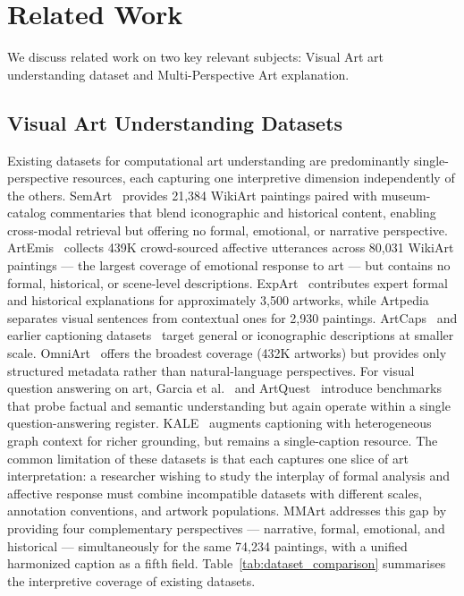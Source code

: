 
\section{Related Work}
We discuss related work on two key relevant subjects: Visual Art art understanding dataset and Multi-Perspective Art explanation.

\subsection{Visual Art Understanding Datasets}

Existing datasets for computational art understanding are predominantly single-perspective resources, each capturing one interpretive dimension independently of the others.
SemArt~\cite{semart_2018} provides 21,384 WikiArt paintings paired with museum-catalog commentaries that blend iconographic and historical content, enabling cross-modal retrieval but offering no formal, emotional, or narrative perspective.
ArtEmis~\cite{achlioptas2021artemis} collects 439K crowd-sourced affective utterances across 80,031 WikiArt paintings — the largest coverage of emotional response to art — but contains no formal, historical, or scene-level descriptions.
ExpArt~\cite{ExpArt_acl2024} contributes expert formal and historical explanations for approximately 3,500 artworks, while Artpedia~\cite{2019_Artpedia} separates visual sentences from contextual ones for 2,930 paintings.
ArtCaps~\cite{ArtCaps} and earlier captioning datasets~\cite{MM_19_art, Iconographic_IC} target general or iconographic descriptions at smaller scale.
OmniArt~\cite{2017omniart} offers the broadest coverage (432K artworks) but provides only structured metadata rather than natural-language perspectives. For visual question answering on art, Garcia et al.~\cite{garcia_dataset_2020} and ArtQuest~\cite{bleidt_artquest_2024} introduce benchmarks that probe factual and semantic understanding but again operate within a single question-answering register.
KALE~\cite{ijcai2024p848} augments captioning with heterogeneous graph context for richer grounding, but remains a single-caption resource.
The common limitation of these datasets is that each captures one slice of art interpretation: a researcher wishing to study the interplay of formal analysis and affective response must combine incompatible datasets with different scales, annotation conventions, and artwork populations.
MMArt addresses this gap by providing four complementary perspectives — narrative, formal, emotional, and historical — simultaneously for the same 74,234 paintings, with a unified harmonized caption as a fifth field.
Table~\ref{tab:dataset_comparison} summarises the interpretive coverage of existing datasets.


